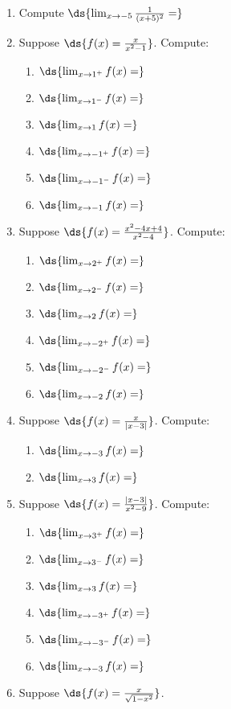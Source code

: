 \begin{multicols}{2}
\begin{enumerate}
\item Compute $\ds{\lim_{x\to-5}\frac1{(x+5)^2}=}$
\item Suppose $\ds{f(x)=\frac{x}{x^2-1}}$. Compute:
  \begin{enumerate}
  \item $\ds{\lim_{x\to1^+}f(x)=}$
  \item $\ds{\lim_{x\to1^-}f(x)=}$
  \item $\ds{\lim_{x\to1}f(x)=}$
  \item $\ds{\lim_{x\to-1^+}f(x)=}$
  \item $\ds{\lim_{x\to-1^-}f(x)=}$
  \item $\ds{\lim_{x\to-1}f(x)=}$
  \end{enumerate}
\item Suppose $\ds{f(x)=\frac{x^2-4x+4}{x^2-4}}$. Compute:
  \begin{enumerate}
  \item $\ds{\lim_{x\to2^+}f(x)=}$
  \item $\ds{\lim_{x\to2^-}f(x)=}$
  \item $\ds{\lim_{x\to2}f(x)=}$
  \item $\ds{\lim_{x\to-2^+}f(x)=}$
  \item $\ds{\lim_{x\to-2^-}f(x)=}$
  \item $\ds{\lim_{x\to-2}f(x)=}$
  \end{enumerate}
\item Suppose $\ds{f(x)=\frac{x}{|x-3|}}$. Compute:
  \begin{enumerate}
  \item $\ds{\lim_{x\to-3}f(x)=}$
  \item $\ds{\lim_{x\to3}f(x)=}$
  \end{enumerate}
\item Suppose $\ds{f(x)=\frac{|x-3|}{x^2-9}}$. Compute:
  \begin{enumerate}
  \item $\ds{\lim_{x\to3^+}f(x)=}$
  \item $\ds{\lim_{x\to3^-}f(x)=}$
  \item $\ds{\lim_{x\to3}f(x)=}$
  \item $\ds{\lim_{x\to-3^+}f(x)=}$
  \item $\ds{\lim_{x\to-3^-}f(x)=}$
  \item $\ds{\lim_{x\to-3}f(x)=}$
  \end{enumerate}
\item Suppose $\ds{f(x)=\frac{x}{\sqrt{1-x^2}}}$.

\end{enumerate}
\end{multicols}
